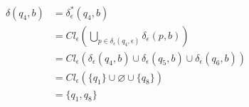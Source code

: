 \documentclass{article}
\begin{document}
\begin{enumerate}
{\begin{enumerate}
{					\begin{align*}
						\delta(q_{4}, b) &= \delta^{*}_{\epsilon}(q_{4}, b) \\
						&= Cl_{\epsilon}(\bigcup_{p \in \delta_{\epsilon}(q_{4}, \epsilon)}
						{\delta_{\epsilon}(p, b)}) \\
						&= Cl_{\epsilon}(\delta_{\epsilon}(q_{4}, b) 
						\cup \delta_{\epsilon}(q_{5}, b)
						\cup \delta_{\epsilon}(q_{6}, b))\\
						&= Cl_{\epsilon}(\{q_{1}\} \cup \varnothing \cup \{q_{8}\})\\
						&= \{q_{1}, q_{8}\}
					\end{align*}

				}
    		\end{enumerate}
    	}
    \end{enumerate}
\end{document}
